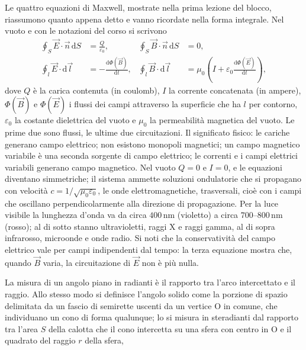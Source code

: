 \documentclass[11pt,a4paper]{article}
\newcommand{\dd}{\mathrm{d}}
\newcommand{\un}[1]{\,\mathrm{#1}}
\newcommand{\titoletto}[1]{\par\Needspace{4\baselineskip}\medskip\noindent{\large\scshape #1}\par\nopagebreak\smallskip\noindent}
\begin{document}
Le quattro equazioni di Maxwell, mostrate nella prima lezione del blocco, riassumono quanto appena detto e vanno ricordate nella forma integrale. Nel vuoto e con le notazioni del corso si scrivono
\begin{align*}
\oint_S\vec E\cdot\vec n\,\dd S&=\frac{Q}{\varepsilon_0}, &
\oint_S\vec B\cdot\vec n\,\dd S&=0,\\
\oint_l\vec E\cdot\dd\vec l&=-\frac{\dd\Phi(\vec B)}{\dd t}, &
\oint_l\vec B\cdot\dd\vec l&=\mu_0\left(I+\varepsilon_0\frac{\dd\Phi(\vec E)}{\dd t}\right),
\end{align*}
dove $Q$ è la carica contenuta (in coulomb), $I$ la corrente concatenata (in ampere), $\Phi(\vec B)$ e $\Phi(\vec E)$ i flussi dei campi attraverso la superficie che ha $l$ per contorno, $\varepsilon_0$ la costante dielettrica del vuoto e $\mu_0$ la permeabilità magnetica del vuoto. Le prime due sono flussi, le ultime due circuitazioni. Il significato fisico: le cariche generano campo elettrico; non esistono monopoli magnetici; un campo magnetico variabile è una seconda sorgente di campo elettrico; le correnti e i campi elettrici variabili generano campo magnetico. Nel vuoto $Q=0$ e $I=0$, e le equazioni diventano simmetriche; il sistema ammette soluzioni ondulatorie che si propagano con velocità $c=1/\sqrt{\mu_0\varepsilon_0}$, le onde elettromagnetiche, trasversali, cioè con i campi che oscillano perpendicolarmente alla direzione di propagazione. Per la luce visibile la lunghezza d'onda va da circa $400\un{nm}$ (violetto) a circa $700$--$800\un{nm}$ (rosso); al di sotto stanno ultravioletti, raggi X e raggi gamma, al di sopra infrarosso, microonde e onde radio. Si noti che la conservatività del campo elettrico vale per campi indipendenti dal tempo: la terza equazione mostra che, quando $\vec B$ varia, la circuitazione di $\vec E$ non è più nulla.

\titoletto{Angolo solido}
La misura di un angolo piano in radianti è il rapporto tra l'arco intercettato e il raggio. Allo stesso modo si definisce l'angolo solido come la porzione di spazio delimitata da un fascio di semirette uscenti da un vertice O in comune, che individuano un cono di forma qualunque; lo si misura in steradianti dal rapporto tra l'area $S$ della calotta che il cono intercetta su una sfera con centro in O e il quadrato del raggio $r$ della sfera,
\end{document}
